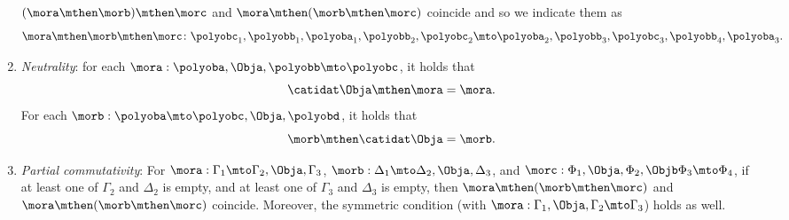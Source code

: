 \begin{ctdefinition}[Polycategory]
\begin{enumerate}
              $(\mora\mthen\morb)\mthen\morc$ and  $\mora\mthen(\morb\mthen\morc)$  coincide
              and so we indicate them as
              \begin{equation}
                  \mora\mthen\morb\mthen\morc \colon \polyobc_1 , \polyobb_1 ,  \polyoba_1 , \polyobb_2  ,\polyobc_2
                  \mto
                  \polyoba_2, \polyobb_3, \polyobc_3 ,\polyobb_4, \polyoba_3.
              \end{equation}
        \item \emph{Neutrality}: for each $\mora: \polyoba, \Obja, \polyobb \mto \polyobc$, it holds that
              \begin{equation}
                  \catidat\Obja  \mthen \mora  =\mora.
              \end{equation}
              For each $\morb: \polyoba \mto \polyobc, \Obja, \polyobd$, it holds that
              \begin{equation}
                  \morb \mthen \catidat\Obja =\morb.
              \end{equation}
        \item \emph{Partial commutativity}:
              For $\mora: \Gamma_1 \mto  \Gamma_2, \Obja, \Gamma_3$, $\morb: \Delta_1 \mto  \Delta_2, \Obja , \Delta_3$, and
              $\morc: \Phi_1, \Obja, \Phi_2, \Objb \Phi_3 \mto \Phi_4$, if at least one of $\Gamma_2$ and $\Delta_2$ is empty,
              and at least one of $\Gamma_3$ and $\Delta_3$ is empty, then $\mora\mthen(\morb\mthen\morc)$ and $\mora\mthen(\morb\mthen\morc)$ coincide.
              Moreover, the symmetric condition (with $\mora: \Gamma_1, \Obja, \Gamma_2 \mto \Gamma_3$) holds as well.
    \end{enumerate}
\end{ctdefinition}
